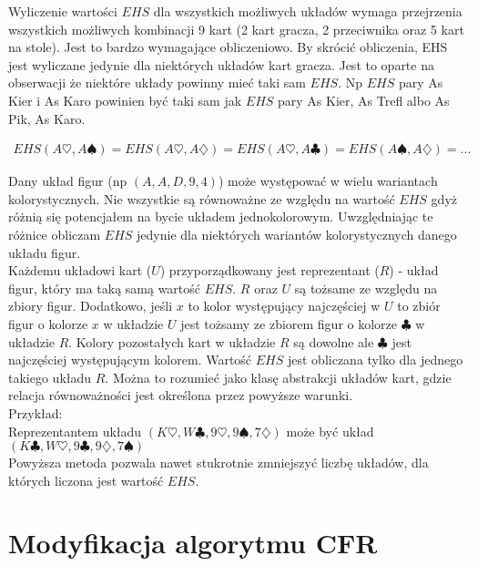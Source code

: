 \documentclass[licencjacka]{pracamgr}
\begin{document}
\noindent
Wyliczenie wartości $EHS$ dla wszystkich możliwych układów wymaga przejrzenia wszystkich możliwych kombinacji 9 kart (2 kart gracza, 2 przeciwnika
oraz 5 kart na stole). Jest to bardzo wymagające obliczeniowo. By skrócić obliczenia, EHS jest wyliczane jedynie dla niektórych układów
kart gracza. Jest to oparte na obserwacji że niektóre układy powinny mieć taki sam $EHS$. Np $EHS$ pary As Kier i As Karo powinien być taki
sam jak $EHS$ pary As Kier, As Trefl albo As Pik, As Karo. 

\begin{align*}
EHS(A\heartsuit, A\spadesuit) = EHS(A\heartsuit, A\diamondsuit) = EHS(A\heartsuit, A\clubsuit) = EHS(A\spadesuit, A\diamondsuit) = ...
\end{align*}

\noindent
Dany układ figur (np $(A,A,D,9,4)$) może występować w wielu wariantach kolorystycznych. Nie wszystkie są równoważne ze względu
na wartość $EHS$ gdyż różnią się potencjałem na bycie układem jednokolorowym. Uwzględniając te różnice obliczam $EHS$ jedynie
dla niektórych wariantów kolorystycznych danego układu figur. \\

\noindent
Każdemu układowi kart ($U$) przyporządkowany jest reprezentant ($R$) - układ figur, który ma taką samą wartość $EHS$.
$R$ oraz $U$ są tożsame ze względu na zbiory figur. Dodatkowo, jeśli $x$ to kolor występujący najczęściej w $U$
to zbiór figur o kolorze $x$ w układzie $U$ jest tożsamy ze zbiorem figur o kolorze $\clubsuit$ w układzie $R$.
Kolory pozostałych kart w układzie $R$ są dowolne ale $\clubsuit$ jest najczęściej występującym kolorem. Wartość
$EHS$ jest obliczana tylko dla jednego takiego układu $R$. Można to rozumieć jako klasę abstrakcji układów kart, gdzie
relacja równoważności jest określona przez powyższe warunki. \\

\noindent
Przykład: \\

\noindent
Reprezentantem układu $(K\heartsuit, W\clubsuit, 9\heartsuit, 9\spadesuit, 7\diamondsuit)$ może być układ
$(K\clubsuit, W\heartsuit, 9\clubsuit, 9\diamondsuit, 7\spadesuit)$ \\

\noindent
Powyższa metoda pozwala nawet stukrotnie zmniejszyć liczbę układów, dla których liczona jest wartość $EHS$.

\section{Modyfikacja algorytmu CFR}
\end{document}
